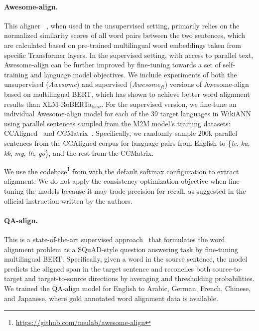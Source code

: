 \documentclass[11pt,dvipsnames]{article}
\begin{document}
\paragraph{Awesome-align.} This aligner ~\citep{dou2021awesome}, when used in the unsupervised setting, primarily relies on the normalized similarity scores of all word pairs between the two sentences, which are calculated based on pre-trained multilingual word embeddings taken from specific Transformer layers. In the supervised setting, with access to parallel text, Awesome-align can be further improved by fine-tuning towards a set of self-training and language model objectives. We include experiments of both the unsupervised (\textit{Awesome}) and supervised (\textit{Awesome$_{ft}$}) versions of Awesome-align based on multilingual BERT, which has shown to achieve better word alignment results than XLM-RoBERTa$_{\text{base}}$.  
For the supervised version, we fine-tune an individual Awesome-align model for each of the 39 target languages in WikiANN using parallel sentences sampled from the M2M model's \cite{fan2021beyond} training datasets: CCAligned~\citep{el-kishky-etal-2020-ccaligned} and CCMatrix~\citep{schwenk-etal-2021-ccmatrix}.
Specifically, we randomly sample 200k parallel sentences from the CCAligned corpus for language pairs from English to \{\textit{te}, \textit{ka}, \textit{kk}, \textit{my}, \textit{th}, \textit{yo}\}, and the rest from the CCMatrix.

We use the codebase\footnote{\url{https://github.com/neulab/awesome-align}} from \citet{dou2021awesome} with the default softmax configuration to extract alignment. 
We do not apply the consistency optimization objective when fine-tuning the models because it may trade precision for recall, as suggested in the official instruction written by the authors.

\paragraph{QA-align.} This is a state-of-the-art  supervised approach~\citep{nagata2020supervised} that formulates the word alignment problem as a SQuAD-style question answering task by fine-tuning  multilingual BERT. Specifically, given a word in the source sentence, the model predicts the aligned span in the target sentence and reconciles both source-to-target and target-to-source directions by averaging and thresholding probabilities.  We trained the QA-align model for English to Arabic, German, French, Chinese, and Japanese, where gold annotated word alignment data is available.
\end{document}
